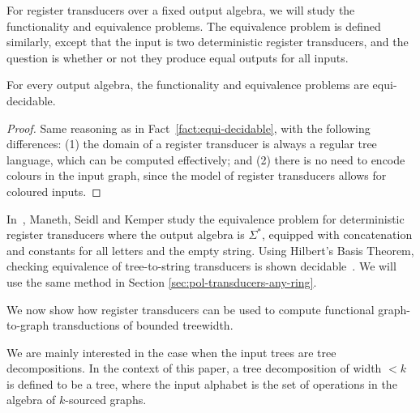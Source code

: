For register transducers over  a fixed  output algebra, we will study the functionality and equivalence problems. 
The equivalence problem is defined similarly, except that the input is two deterministic register transducers, and the question is whether or not they produce equal outputs for all inputs. 
\begin{fact}
    For every output algebra, the functionality and equivalence problems are equi-decidable.
\end{fact}
\begin{proof}
    Same reasoning as in Fact~\ref{fact:equi-decidable}, with the following differences: (1) the domain of a register transducer is always a regular tree language, which can be computed effectively; and  (2) there is no need to encode colours in the input graph, since the model of register transducers allows for coloured inputs.
\end{proof}

\begin{example} In~\cite{seidlManethKemper2018}, Maneth, Seidl and Kemper study  the equivalence problem for  deterministic register transducers where the output algebra is $\Sigma^*$, equipped with concatenation and constants for all letters and the empty string.  Using Hilbert's Basis Theorem, checking equivalence of tree-to-string transducers is shown decidable~\cite[Corollary 8.2]{seidlManethKemper2018}. We will use the same method in Section \ref{sec:pol-transducers-any-ring}.
\end{example}


 We now show how register transducers can be used to compute functional graph-to-graph \mso transductions of bounded treewidth.




We are mainly interested in the case when the input trees are tree decompositions. In the context of this paper, a tree decomposition of width $<k$ is defined to be a tree, where the input alphabet is the set of operations in the algebra of $k$-sourced graphs. 

